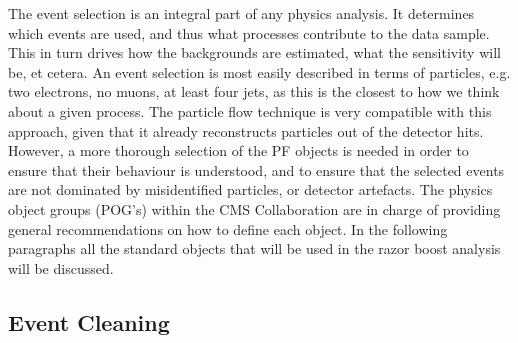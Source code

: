 The event selection is an integral part of any physics analysis. It determines which events are
used, and thus what processes contribute to the data sample. This in turn drives how the
backgrounds are estimated, what the sensitivity will be, et cetera. 
An event selection is most easily described in terms of particles, e.g. two electrons, no muons, at
least four jets, as this is the closest to how we think about a given process.  
The particle flow technique is very compatible with this approach, given that it already
reconstructs particles out of the detector hits. 
However, a more thorough selection of the PF objects is needed in order to ensure that their
behaviour is understood, and to ensure that the selected events are not dominated by
misidentified particles, or detector artefacts. 
The physics object groups (POG's) within the CMS Collaboration are in charge of providing general
recommendations on how to define each object. 
In the following paragraphs all the standard objects that will be used in the razor boost analysis
will be discussed.

% 






\subsection{Event Cleaning \label{sec:event_cleaning}}

